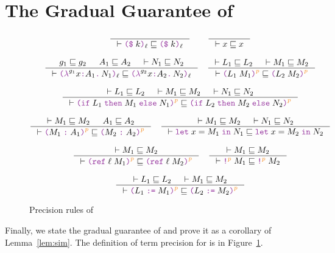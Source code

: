 \section{The Gradual Guarantee of \Surface}
\label{sec:gg}

\begin{figure}[tbp]
  \raggedright
  {\small
  \begin{gather*}
    \inference{}{\vdash \const{k}{\ell} \sqsubseteq \const{k}{\ell}}
    \qquad
    \inference{}{\vdash x \sqsubseteq x}
    \\[2ex]
    \inference{g_1 \sqsubseteq g_2 & A_1 \sqsubseteq A_2 & \vdash N_1 \sqsubseteq N_2 }
              {\vdash \lam{g_1}{x}{A_1}{N_1}{\ell} \sqsubseteq \lam{g_2}{x}{A_2}{N_2}{\ell}}
    \quad
    \inference{\vdash L_1 \sqsubseteq L_2 & \vdash M_1 \sqsubseteq M_2}
              {\vdash \app{L_1}{M_1}{p} \sqsubseteq \app{L_2}{M_2}{p}}
    \\[2ex]
    \inference{\vdash L_1 \sqsubseteq L_2 & \vdash M_1 \sqsubseteq M_2 & \vdash N_1 \sqsubseteq N_2}
              {\vdash \ifexp{L_1}{M_1}{N_1}{p} \sqsubseteq \ifexp{L_2}{M_2}{N_2}{p}}
    \\[2ex]
    \inference{\vdash M_1 \sqsubseteq M_2 & A_1 \sqsubseteq A_2}
              {\vdash \ann{M_1}{A_1}{p} \sqsubseteq \ann{M_2}{A_2}{p}}
    \quad
    \inference{\vdash M_1 \sqsubseteq M_2 & \vdash N_1 \sqsubseteq N_2}
              {\vdash \letexp{x}{M_1}{N_1} \sqsubseteq \letexp{x}{M_2}{N_2}}
    \\[2ex]
    \inference{\vdash M_1 \sqsubseteq M_2}
              {\vdash \refexp{\ell}{M_1}{p} \sqsubseteq \refexp{\ell}{M_2}{p}}
    \quad
    \inference{\vdash M_1 \sqsubseteq M_2}
              {\vdash \deref{M_1}{p} \sqsubseteq \deref{M_2}{p}}
    \\[2ex]
    \inference{\vdash L_1 \sqsubseteq L_2 & \vdash M_1 \sqsubseteq M_2}
              {\vdash \assign{L_1}{M_1}{p} \sqsubseteq \assign{L_2}{M_2}{p}}
  \end{gather*}}
  \caption{Precision rules of \Surface}
  \label{fig:surface-precision}
\end{figure}

Finally, we state the gradual guarantee of \Surface and prove it as a
corollary of Lemma~\ref{lem:sim}. The definition of term precision
for \Surface is in Figure~\ref{fig:surface-precision}.

